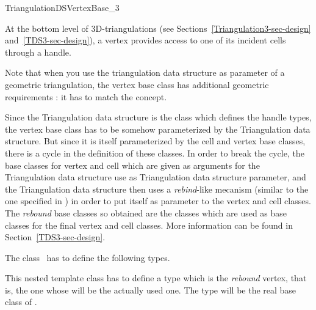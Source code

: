 

\begin{ccRefConcept}{TriangulationDSVertexBase_3}

\ccDefinition
  
At the bottom level of 3D-triangulations 
(see Sections~\ref{Triangulation3-sec-design} and~\ref{TDS3-sec-design}),
a vertex provides access to one of its incident cells through a handle.

Note that when you use the triangulation data structure as parameter of a
geometric triangulation, the vertex base class has additional geometric
requirements : it has to match the  concept.

Since the Triangulation data structure is the class which defines the handle
types, the vertex base class has to be somehow parameterized by the
Triangulation data structure.  But since it is itself parameterized by the cell
and vertex base classes, there is a cycle in the definition of these classes.
In order to break the cycle, the base classes for vertex and cell which are
given as arguments for the Triangulation data structure use  as
Triangulation data structure parameter, and the Triangulation data structure
then uses a {\it rebind}-like mecanism (similar to the one specified in
) in order to put itself as parameter to the vertex and
cell classes.  The {\it rebound} base classes so obtained are the classes which
are used as base classes for the final vertex and cell classes.
More information can be found in Section~\ref{TDS3-sec-design}.

\ccTypes
{}
\ccThreeToTwo
The class \ccRefName\ has to define the following types.

{This nested template class has to define a type  which is the
{\it rebound} vertex, that is, the one whose 
will be the actually used one.  The  type will be the real base
class of .}


\end{ccRefConcept}
